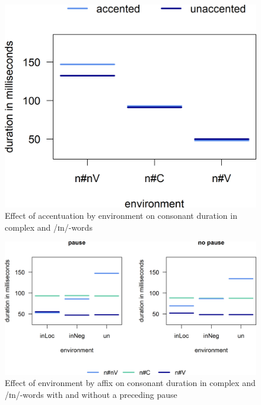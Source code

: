 
 \begin{figure}
	
	\includegraphics [scale=0.5] {images/Experiment/UnInInterEnvAcc}
	\caption{Effect of accentuation by environment on consonant duration in complex  and /ɪn/-words}
	\label{fig: Un In experiment Env and accent}
\end{figure}

\begin{figure}
	
	\includegraphics [scale=0.6] {images/Experiment/UnInInterEnvAffixPause1}
	
	\caption{Effect of environment by affix on consonant duration in complex  and /ɪn/-words with and without a preceding pause}
	\label{fig:Un In experiment}
\end{figure}


